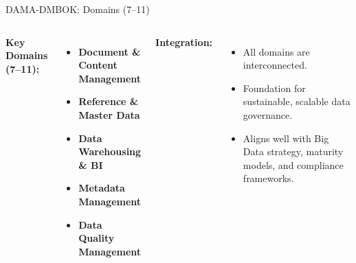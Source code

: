 \documentclass[aspectratio=169, table]{beamer}
\begin{document}
	\begin{frame}[fragile]{DAMA-DMBOK: Domains (7–11)}
		\vspace{20pt}
		\begin{columns}
			\textbf{Key Domains (7–11):}
			\begin{itemize}
				\item \textbf{Document \& Content Management}
				\item \textbf{Reference \& Master Data}
				\item \textbf{Data Warehousing \& BI}
				\item \textbf{Metadata Management}
				\item \textbf{Data Quality Management}
			\end{itemize}
			
			\textbf{Integration:}
			\begin{itemize}
				\item All domains are interconnected.
				\item Foundation for sustainable, scalable data governance.
				\item Aligns well with Big Data strategy, maturity models, and compliance frameworks.
			\end{itemize}
		\end{columns}
	\end{frame}
	
\end{document}
